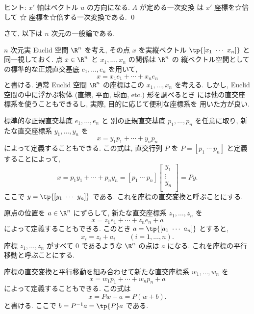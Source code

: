 \documentclass[12pt,twoside]{jarticle}
\begin{document}
\noindent
ヒント: $x'$ 軸はベクトル $u$ の方向になる.  $A$ が定める一次変換
は $x'$ 座標を☆倍して ☆ 座標を☆倍する一次変換である.
\qed

\bigskip

さて, 以下は $n$ 次元の一般論である.

$n$ 次元実 Euclid 空間 $\R^n$ を考え, 
その点 $x$ を実縦ベクトル $\tp{[x_1\ \cdots\ x_n]}$ と同一視しておく.
点 $x\in\R^n$ と $x_1,\dots,x_n$ の関係は $\R^n$ の
縦ベクトル空間としての標準的な正規直交基底 $e_1,\dots,e_n$ を用いて,
\begin{equation*}
  x = x_1 e_1 + \cdots + x_n e_n
\end{equation*}
と書ける.  通常 Euclid 空間 $\R^n$ の座標はこの $x_1,\dots,x_n$ を考える. 
しかし, Euclid 空間の中に浮かぶ物体 (直線, 平面, 球面, etc.) 形を調べるとき
には他の直交座標系を使うこともできるし, 実際, 目的に応じて便利な座標系を
用いた方が良い.

標準的な正規直交基底 $e_1,\dots,e_n$ と
別の正規直交基底 $p_1,\dots,p_n$ を任意に取り,
新たな直交座標系 $y_1,\dots,y_n$ を
\begin{equation*}
  x = y_1 p_1 + \cdots + y_n p_n
\end{equation*}
によって定義することもできる.  
この式は, 直交行列 $P$ を $P=[p_1\ \cdots\ p_n]$ と定義することによって,
\begin{equation*}
  x = p_1 y_1 + \cdots + p_n y_n =
  [p_1\ \cdots\ p_n]
  \begin{bmatrix}
    y_1 \\
    \vdots \\
    y_n \\
  \end{bmatrix}
  = Py.
\end{equation*}
ここで $y = \tp{[y_1\ \cdots\ y_n]}$ である.
これを座標の直交変換と呼ぶことにする.

原点の位置を $a\in\R^n$ にずらして, 
新たな直交座標系 $z_1,\dots,z_n$ を
\begin{equation*}
  x = z_1 e_1 + \cdots + z_n e_n + a
\end{equation*}
によって定義することもできる. 
このとき $a = \tp{[a_1\ \cdots\ a_n]}$ とすると,
\begin{equation*}
  x_i = z_i + a_i \qquad (i=1,\dots,n).
\end{equation*}
座標 $z_1,\dots,z_n$ がすべて $0$ であるような $\R^n$ の点は $a$ になる.
これを座標の平行移動と呼ぶことにする.

座標の直交変換と平行移動を組み合わせて新たな直交座標系 $w_1,\dots,w_n$ を
\begin{equation*}
  x = w_1 p_1 + \cdots + w_n p_n + a
\end{equation*}
によって定義することもできる.  この式は
\begin{equation*}
  x = Pw + a = P(w + b).
\end{equation*}
と書ける. ここで $b=P^{-1}a=\tp{P}a$ である. 
\end{document}
